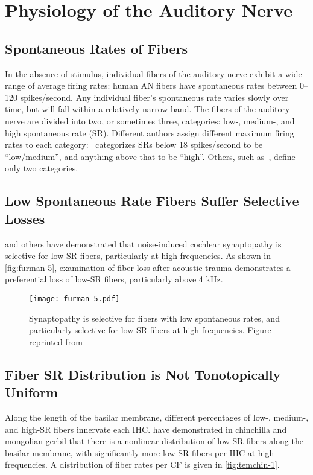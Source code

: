 \section{Physiology of the Auditory Nerve} %
\label{sec:physiology_of_the_auditory_nerve}
\subsection{Spontaneous Rates of Fibers} %
\label{sub:spontaneous_rates_of_fibers}
In the absence of stimulus, individual fibers of the auditory nerve exhibit a wide range of average firing rates: human AN fibers have spontaneous rates between 0--120 spikes/second.  Any individual fiber's spontaneous rate varies slowly over time, but will fall within a relatively narrow band.  The fibers of the auditory nerve are divided into two, or sometimes three, categories: low-, medium-, and high spontaneous rate (SR).  Different authors assign different maximum firing rates to each category:~\cite{Temchin2008Threshold} categorizes SRs below 18 spikes/second to be ``low/medium'', and anything above that to be ``high''.  Others, such as~\cite{Liberman1978AuditoryNerve}, define only two categories.  
\subsection{Low Spontaneous Rate Fibers Suffer Selective Losses} %
\label{sub:low_spontaneous_rate_fibers_suffer_selective_losses}
\cite{Furman2013NoiseInduced} and others have demonstrated that noise-induced cochlear synaptopathy is selective for low-SR fibers, particularly at high frequencies.  As shown in \autoref{fig:furman-5}, examination of fiber loss after acoustic trauma demonstrates a preferential loss of low-SR fibers, particularly above 4 kHz.  

\begin{figure}[htbp]
	\centering
	\texttt{[image: furman-5.pdf]}
	\caption[Synaptopathy is Selective]{Synaptopathy is selective for fibers with low spontaneous rates, and particularly selective for low-SR fibers at high frequencies. Figure reprinted from~\cite{Furman2013NoiseInduced}}
	\label{fig:furman-5}
\end{figure}

\subsection{Fiber SR Distribution is Not Tonotopically Uniform} %
\label{sub:fiber_rates_are_tonotopically_nonuniform}
Along the length of the basilar membrane, different percentages of low-, medium-, and high-SR fibers innervate each IHC.  \cite{Temchin2008Threshold,Temchin2014Spatial,Bourien2014Contribution} have demonstrated in chinchilla and mongolian gerbil that there is a nonlinear distribution of low-SR fibers along the basilar membrane, with significantly more low-SR fibers per IHC at high frequencies.   A distribution of fiber rates per CF is given in \autoref{fig:temchin-1}.

